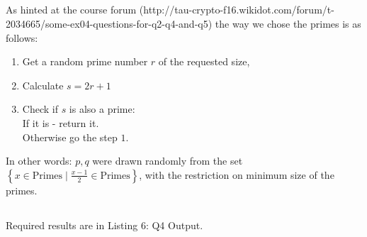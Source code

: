 \documentclass{article}
\begin{document}
\subsection{} %
As hinted at the course forum (http://tau-crypto-f16.wikidot.com/forum/t-2034665/some-ex04-questions-for-q2-q4-and-q5) the way we chose the primes is as follows:
\begin{enumerate}
\item Get a random prime number $r$ of the requested size,
\item Calculate $s = 2r + 1$ 
\item Check if $s$ is also a prime:\\
 If it is - return it. \\
 Otherwise go the step $1$.
\end{enumerate}
In other words: $p, q$ were drawn randomly from the set $\left\{ x \in \mbox{Primes} \mid \frac{x-1}{2} \in \mbox{Primes} \right\}$, with the restriction on minimum size of the primes.

\subsection{} %
Required results are in Listing 6: Q4 Output.

\section{} %
\end{document}
